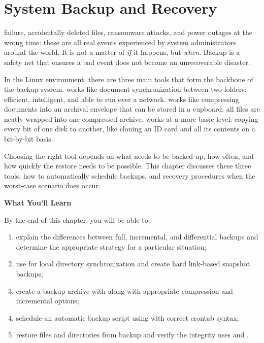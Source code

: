 
\chapter{System Backup and Recovery}
\label{ch:backup-and-recovery}


 failure, accidentally deleted files, ransomware attacks, and power outages at the wrong time: these are all real events experienced by system administrators around the world. It is not a matter of \textit{if} it happens, but \textit{when}. Backup is a safety net that ensures a bad event does not become an unrecoverable disaster.

In the Linux environment, there are three main tools that form the backbone of the backup system.  works like document synchronization between two folders: efficient, intelligent, and able to run over a network.  works like compressing documents into an archival envelope that can be stored in a cupboard: all files are neatly wrapped into one compressed archive.  works at a more basic level: copying every bit of one disk to another, like cloning an ID card and all its contents on a bit-by-bit basis.

Choosing the right tool depends on what needs to be backed up, how often, and how quickly the restore needs to be possible. This chapter discusses these three tools, how to automatically schedule backups, and recovery procedures when the worst-case scenario does occur.

\textbf{What You'll Learn}

By the end of this chapter, you will be able to:

\begin{enumerate}
\item explain the differences between full, incremental, and differential backups
and determine the appropriate strategy for a particular situation;
\item use  for local directory synchronization and create
hard link-based snapshot backups;
\item create a backup archive with  along with appropriate compression
and incremental options;
\item schedule an automatic backup script using  with
correct crontab syntax;
\item restore files and directories from backup and verify
the integrity uses  and .
\end{enumerate}

